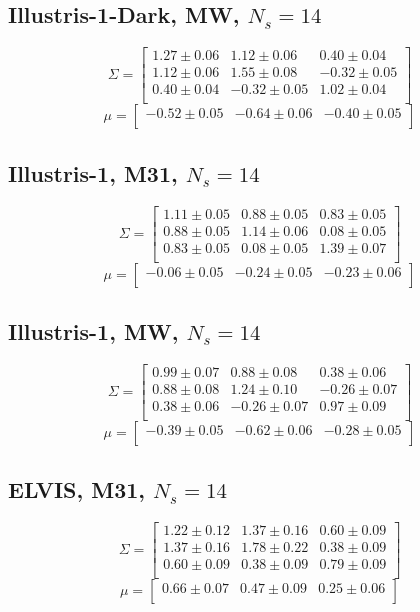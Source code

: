 \documentclass[a4paper,fleqn,usenatbib]{mnras}
\begin{document}
\subsection{Illustris-1-Dark, MW, $N_s=14$}
\[
\Sigma=
\begin{bmatrix}
1.27 \pm 0.06 & 1.12 \pm 0.06 & 0.40 \pm 0.04\\
1.12 \pm 0.06 & 1.55 \pm 0.08 & -0.32 \pm 0.05\\
0.40 \pm 0.04 & -0.32 \pm 0.05 & 1.02 \pm 0.04\\
\end{bmatrix}
\]
\[
\mu=
\begin{bmatrix}
-0.52 \pm 0.05 & -0.64 \pm 0.06 & -0.40 \pm 0.05\\
\end{bmatrix}
\]

\subsection{Illustris-1, M31, $N_s=14$}
\[
\Sigma=
\begin{bmatrix}
1.11 \pm 0.05 & 0.88 \pm 0.05 & 0.83 \pm 0.05\\
0.88 \pm 0.05 & 1.14 \pm 0.06 & 0.08 \pm 0.05\\
0.83 \pm 0.05 & 0.08 \pm 0.05 & 1.39 \pm 0.07\\
\end{bmatrix}
\]
\[
\mu=
\begin{bmatrix}
-0.06 \pm 0.05 & -0.24 \pm 0.05 & -0.23 \pm 0.06\\
\end{bmatrix}
\]
\subsection{Illustris-1, MW, $N_s=14$}
\[
\Sigma=
\begin{bmatrix}
0.99 \pm 0.07 & 0.88 \pm 0.08 & 0.38 \pm 0.06\\
0.88 \pm 0.08 & 1.24 \pm 0.10 & -0.26 \pm 0.07\\
0.38 \pm 0.06 & -0.26 \pm 0.07 & 0.97 \pm 0.09\\
\end{bmatrix}
\]
\[
\mu=
\begin{bmatrix}
-0.39 \pm 0.05 & -0.62 \pm 0.06 & -0.28 \pm 0.05\\
\end{bmatrix}
\]

\subsection{ELVIS, M31, $N_s=14$}
\[
\Sigma=
\begin{bmatrix}
1.22 \pm 0.12 & 1.37 \pm 0.16 & 0.60 \pm 0.09\\
1.37 \pm 0.16 & 1.78 \pm 0.22 & 0.38 \pm 0.09\\
0.60 \pm 0.09 & 0.38 \pm 0.09 & 0.79 \pm 0.09\\
\end{bmatrix}
\]
\[
\mu=
\begin{bmatrix}
0.66 \pm 0.07 & 0.47 \pm 0.09 & 0.25 \pm 0.06\\
\end{bmatrix}
\]
\end{document}
